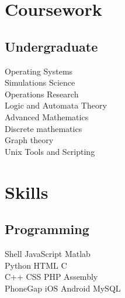 \documentclass[]{deedy-resume-openfont}
\begin{document}
\begin{minipage}[t]{0.33\textwidth}
\section{Coursework}
\subsection{Undergraduate}
Operating Systems \\
Simulations Science \\
Operations Research \\
Logic and Automata Theory \\
Advanced Mathematics \\
Discrete mathematics \\
Graph theory \\
Unix Tools and Scripting \\
\sectionsep


\section{Skills}
\subsection{Programming}
Shell \textbullet{} JavaScript \textbullet{} Matlab \\
Python \textbullet{} HTML \textbullet{} C \\
C++ \textbullet{} CSS \textbullet{} PHP \textbullet{} Assembly \\
PhoneGap \textbullet{} iOS \textbullet{} Android \textbullet{} MySQL
\sectionsep

%
%

\end{minipage} 
\hfill
\end{document}
